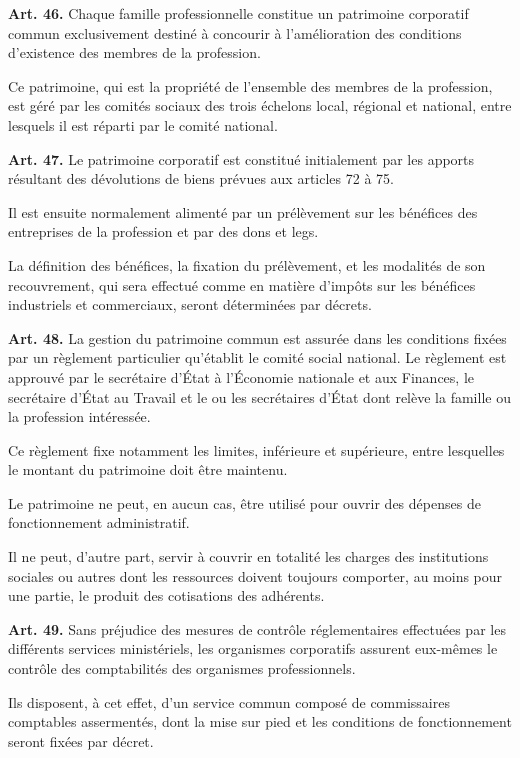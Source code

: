 \documentclass[french,twoside]{book} %
\newcommand{\labelchar}[1]{\textbf{\color{rubric} #1}}
\def\mednobreak{\ifdim\lastskip<\medskipamount
  \removelastskip\nopagebreak\medskip\fi}
\newcommand{\labelblock}[1]{\medbreak{\noindent\color{rubric}\bfseries #1}\par\mednobreak}
\begin{document}
\noindent \labelchar{Art. 46.} Chaque famille professionnelle constitue un patrimoine corporatif commun exclusivement destiné à concourir à l’amélioration des conditions d’existence des membres de la profession.\par
Ce patrimoine, qui est la propriété de l’ensemble des membres de la profession, est géré par les comités sociaux des trois échelons local, régional et national, entre lesquels il est réparti par le comité national.\par
\bigbreak
\noindent \labelchar{Art. 47.} Le patrimoine corporatif est constitué initialement par les apports résultant des dévolutions de biens prévues aux articles 72 à 75.\par
Il est ensuite normalement alimenté par un prélèvement sur les bénéfices des entreprises de la profession et par des dons et legs.\par
La définition des bénéfices, la fixation du prélèvement, et les modalités de son recouvrement, qui sera effectué comme en matière d’impôts sur les bénéfices industriels et commerciaux, seront déterminées par décrets.\par
\bigbreak
\noindent \labelchar{Art. 48.} La gestion du patrimoine commun est assurée dans les conditions fixées par un règlement particulier qu’établit le comité social national. Le règlement est approuvé par le secrétaire d’État à l’Économie nationale et aux Finances, le secrétaire d’État au Travail et le ou les secrétaires d’État dont relève la famille ou la profession intéressée.\par
Ce règlement fixe notamment les limites, inférieure et supérieure, entre lesquelles le montant du patrimoine doit être maintenu.\par
Le patrimoine ne peut, en aucun cas, être utilisé pour ouvrir des dépenses de fonctionnement administratif.\par
Il ne peut, d’autre part, servir à couvrir en totalité les charges des institutions sociales ou autres dont les ressources doivent toujours comporter, au moins pour une partie, le produit des cotisations des adhérents.\par

\labelblock{Le contrôle financier}

\noindent \labelchar{Art. 49.} Sans préjudice des mesures de contrôle réglementaires effectuées par les différents services ministériels, les organismes corporatifs assurent eux-mêmes le contrôle des comptabilités des organismes professionnels.\par
Ils disposent, à cet effet, d’un service commun composé de commissaires comptables assermentés, dont la mise sur pied et les conditions de fonctionnement seront fixées par décret.\par
\end{document}
